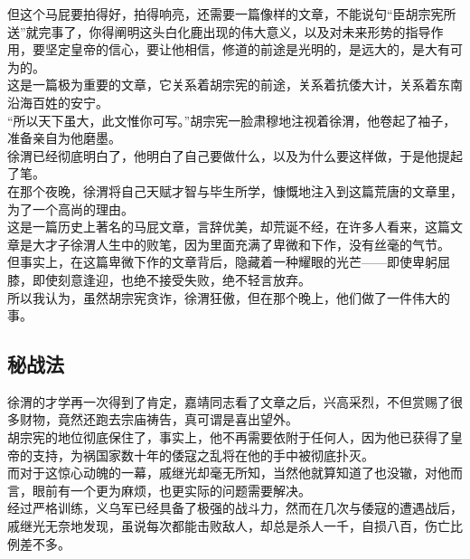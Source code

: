\begin{multicols}{\theparacolNo}
但这个马屁要拍得好，拍得响亮，还需要一篇像样的文章，不能说句“臣胡宗宪所送”就完事了，你得阐明这头白化鹿出现的伟大意义，以及对未来形势的指导作用，要坚定皇帝的信心，要让他相信，修道的前途是光明的，是远大的，是大有可为的。\\

这是一篇极为重要的文章，它关系着胡宗宪的前途，关系着抗倭大计，关系着东南沿海百姓的安宁。\\

“所以天下虽大，此文惟你可写。”胡宗宪一脸肃穆地注视着徐渭，他卷起了袖子，准备亲自为他磨墨。\\

徐渭已经彻底明白了，他明白了自己要做什么，以及为什么要这样做，于是他提起了笔。\\

在那个夜晚，徐渭将自己天赋才智与毕生所学，慷慨地注入到这篇荒唐的文章里，为了一个高尚的理由。\\

这是一篇历史上著名的马屁文章，言辞优美，却荒诞不经，在许多人看来，这篇文章是大才子徐渭人生中的败笔，因为里面充满了卑微和下作，没有丝毫的气节。\\

但事实上，在这篇卑微下作的文章背后，隐藏着一种耀眼的光芒——即使卑躬屈膝，即使刻意逢迎，也绝不接受失败，绝不轻言放弃。\\

所以我认为，虽然胡宗宪贪诈，徐渭狂傲，但在那个晚上，他们做了一件伟大的事。\\

\subsection{秘战法}
徐渭的才学再一次得到了肯定，嘉靖同志看了文章之后，兴高采烈，不但赏赐了很多财物，竟然还跑去宗庙祷告，真可谓是喜出望外。\\

胡宗宪的地位彻底保住了，事实上，他不再需要依附于任何人，因为他已获得了皇帝的支持，为祸国家数十年的倭寇之乱将在他的手中被彻底扑灭。\\

而对于这惊心动魄的一幕，戚继光却毫无所知，当然他就算知道了也没辙，对他而言，眼前有一个更为麻烦，也更实际的问题需要解决。\\

经过严格训练，义乌军已经具备了极强的战斗力，然而在几次与倭寇的遭遇战后，戚继光无奈地发现，虽说每次都能击败敌人，却总是杀人一千，自损八百，伤亡比例差不多。\\


\end{multicols}
